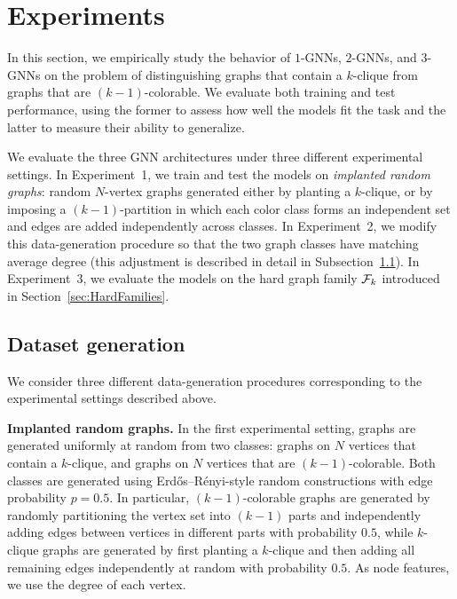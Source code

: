 \section{Experiments}\label{sec:Experiments}
In this section, we empirically study the behavior of $1$-GNNs, $2$-GNNs, and $3$-GNNs on the problem of distinguishing graphs that contain a $k$-clique from graphs that are $(k\!-\!1)$-colorable. We evaluate both training and test performance, using the former to assess how well the models fit the task and the latter to measure their ability to generalize.

We evaluate the three GNN architectures under three different experimental settings. In Experiment~1, we train and test the models on \emph{implanted random graphs}: random $N$-vertex graphs generated either by planting a $k$-clique, or by imposing a $(k\!-\!1)$-partition in which each color class forms an independent set and edges are added independently across classes. In Experiment~2, we modify this data-generation procedure so that the two graph classes have matching average degree (this adjustment is described in detail in Subsection~\ref{subsec:DataGeneration}). In Experiment~3, we evaluate the models on the hard graph family $\mathcal{F}_k$ introduced in Section~\ref{sec:HardFamilies}.


\subsection{Dataset generation}\label{subsec:DataGeneration}

We consider three different data-generation procedures corresponding to the experimental settings described above.

\textbf{Implanted random graphs.} 
In the first experimental setting, graphs are generated uniformly at random from two classes: graphs on $N$ vertices that contain a $k$-clique, and graphs on $N$ vertices that are $(k\!-\!1)$-colorable. Both classes are generated using Erd\H{o}s--R\'enyi-style random constructions with edge probability $p=0.5$. In particular, $(k\!-\!1)$-colorable graphs are generated by randomly partitioning the vertex set into $(k\!-\!1)$ parts and independently adding edges between vertices in different parts with probability $0.5$, while $k$-clique graphs are generated by first planting a $k$-clique and then adding all remaining edges independently at random with probability $0.5$. As node features, we use the degree of each vertex.

